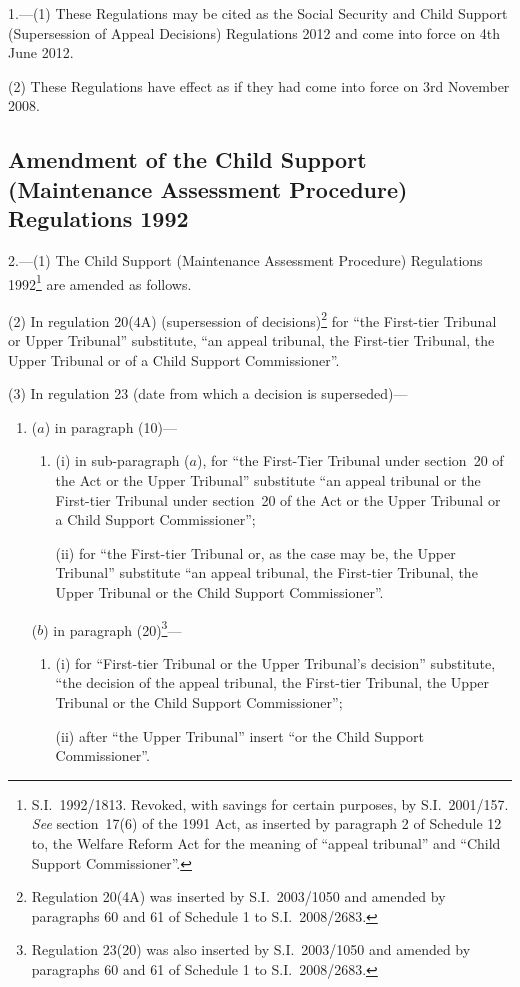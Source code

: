 \documentclass[12pt,a4paper]{article}
\begin{document}
1.---(1)  These Regulations may be cited as the Social Security and Child Support (Supersession of Appeal Decisions) Regulations 2012 and come into force on 4th June 2012.

(2) These Regulations have effect as if they had come into force on 3rd November 2008.

\subsection[2. Amendment of the Child Support (Maintenance Assessment Procedure) Regulations 1992]{Amendment of the Child Support (Maintenance Assessment Procedure) Regulations 1992}

2.---(1)  The Child Support (Maintenance Assessment Procedure) Regulations 1992\footnote{S.I.~1992/1813. Revoked, with savings for certain purposes, by S.I.~2001/157. \emph{See} section~17(6) of the 1991 Act, as inserted by paragraph 2 of Schedule 12 to, the Welfare Reform Act for the meaning of “appeal tribunal” and “Child Support Commissioner”.} are amended as follows.

(2) In regulation 20(4A) (supersession of decisions)\footnote{Regulation 20(4A) was inserted by S.I.~2003/1050 and amended by paragraphs 60 and 61 of Schedule 1 to S.I.~2008/2683.} for “the First-tier Tribunal or Upper Tribunal” substitute, “an appeal tribunal, the First-tier Tribunal, the Upper Tribunal or of a Child Support Commissioner”.

(3) In regulation 23 (date from which a decision is superseded)—
\begin{enumerate}\item[]
($a$) in paragraph (10)—
\begin{enumerate}\item[]
(i) in sub-paragraph ($a$), for “the First-Tier Tribunal under section~20 of the Act or the Upper Tribunal” substitute “an appeal tribunal or the First-tier Tribunal under section~20 of the Act or the Upper Tribunal or a Child Support Commissioner”;

(ii) for “the First-tier Tribunal or, as the case may be, the Upper Tribunal” substitute “an appeal tribunal, the First-tier Tribunal, the Upper Tribunal or the Child Support Commissioner”.
\end{enumerate}

($b$) in paragraph (20)\footnote{Regulation 23(20) was also inserted by S.I.~2003/1050 and amended by paragraphs 60 and 61 of Schedule 1 to S.I.~2008/2683.}—
\begin{enumerate}\item[]
(i) for “First-tier Tribunal or the Upper Tribunal’s decision” substitute, “the decision of the appeal tribunal, the First-tier Tribunal, the Upper Tribunal or the Child Support Commissioner”;

(ii) after “the Upper Tribunal” insert “or the Child Support Commissioner”.
\end{enumerate}
\end{enumerate}
\end{document}
